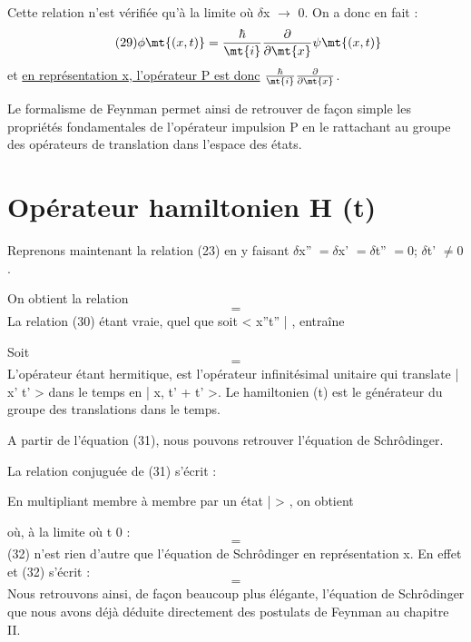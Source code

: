 Cette relation n'est vérifiée qu'à la limite où $\delta$x $\to$ 0. On a donc en fait :
\[
\tag{29}\phi\mt{(x,t)}=\frac{\hbar}{\mt{i}}\frac{\partial}{\partial\mt{x}}\psi\mt{(x,t)}
\]
et \ul{en représentation x, l'opérateur P est donc} $\frac{\hbar}{\mt{i}}\frac{\partial}{\partial\mt{x}}$.

 

Le formalisme de Feynman permet ainsi de retrouver de façon
simple les propriétés fondamentales de l'opérateur impulsion P en le rattachant au groupe des opérateurs de translation dans l'espace des états.
\section{Opérateur hamiltonien H (t)}%
Reprenons maintenant la relation (23) en y faisant
$\delta$x'' $=\delta$x' $=\delta$t'' $= 0$; $\delta$t' $\neq 0$.

On obtient la relation
\[
\tag{30}=
\]
La relation (30) étant vraie, quel que soit < x''t'' | , entraîne

Soit
\[
\tag{31}=
\]
L'opérateur  étant hermitique,  est l'opérateur
infinitésimal unitaire qui translate | x' t' > dans le temps en
| x, t' + t' >.
Le hamiltonien (t) est le générateur du groupe des translations dans le
temps.

A partir de l'équation (31), nous pouvons retrouver l'équation
de Schrôdinger.

La relation conjuguée de (31) s'écrit :

En multipliant membre à membre par un état |  > , on obtient

où, à la limite où t  0 :
\[
\tag{32}=
\]
(32) n'est rien d'autre que l'équation de Schrôdinger en représentation x.
En effet
et (32) s'écrit :
\[
\tag{33}=
\]
Nous retrouvons ainsi, de façon beaucoup plus élégante, l'équation de
Schrôdinger que nous avons déjà déduite directement des postulats de
Feynman au chapitre II.

